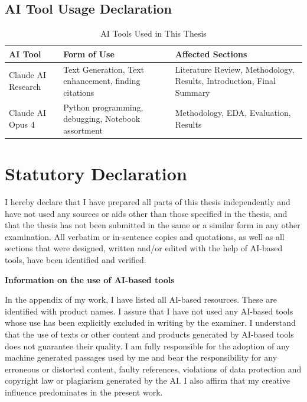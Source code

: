 \documentclass[12pt, a4paper, oneside]{report}
\begin{document}
\section{AI Tool Usage Declaration}

\begin{table}[H]
    \centering
    \caption{AI Tools Used in This Thesis}
    \label{tab:ai_tools}
    \begin{tabularx}{\textwidth}{llX}
        \toprule
        \textbf{AI Tool} & \textbf{Form of Use} & \textbf{Affected Sections} \\
        \midrule
        Claude AI Research & Text Generation, Text enhancement, finding citations & Literature Review, Methodology, Results, Introduction, Final Summary \\
        \addlinespace
        Claude AI Opus 4 & Python programming, debugging, Notebook assortment & Methodology, EDA, Evaluation, Results \\
        \bottomrule
    \end{tabularx}
\end{table}


\newpage
{}
\chapter*{Statutory Declaration}

I hereby declare that I have prepared all parts of this thesis independently and have not used any sources or aids other than those specified in the thesis, and that the thesis has not been submitted in the same or a similar form in any other examination. All verbatim or in-sentence copies and quotations, as well as all sections that were designed, written and/or edited with the help of AI-based tools, have been identified and verified.

\vspace{1cm}

\textbf{Information on the use of AI-based tools}

\vspace{0.5cm}

In the appendix of my work, I have listed all AI-based resources. These are identified with product names. I assure that I have not used any AI-based tools whose use has been explicitly excluded in writing by the examiner. I understand that the use of texts or other content and products generated by AI-based tools does not guarantee their quality. I am fully responsible for the adoption of any machine generated passages used by me and bear the responsibility for any erroneous or distorted content, faulty references, violations of data protection and copyright law or plagiarism generated by the AI. I also affirm that my creative influence predominates in the present work.
\end{document}
